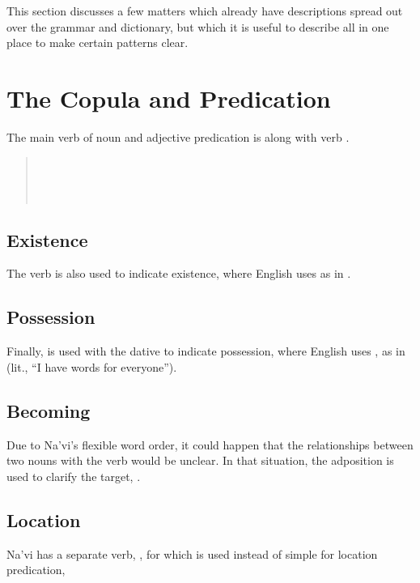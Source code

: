 
This section discusses a few matters which already have descriptions
spread out over the grammar and dictionary, but which it is useful to
describe all in one place to make certain patterns clear.

\section{The Copula and Predication} 
The main verb of noun and adjective predication is  
along with verb  .

\begin{quotation}
\noindent{}  \\
\noindent{}  \\
\noindent{}  \\
\noindent{} 
\end{quotation}

\subsection{Existence}
The verb  is also used to indicate existence, where English uses
 as in 
  .

\subsection{Possession}
Finally,  is used with the dative to indicate possession, where
English uses , as in   (lit., ``I have words for everyone'').

\subsection{Becoming}
Due to Na'vi's flexible word order, it could happen that the
relationships between two nouns with the verb   would
be unclear.  In that situation, the adposition  is used to
clarify the target,  .

\subsection{Location} Na'vi has a separate verb, , for  which is used instead of simple  for location
predication, 

